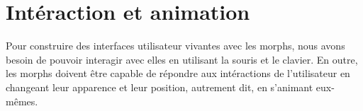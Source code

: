 \documentclass[a4paper,10pt,twoside]{book}
\begin{document}






\section{Int\'eraction et animation}

Pour construire des interfaces utilisateur vivantes avec les morphs,
nous avons besoin de pouvoir interagir avec elles en utilisant la
souris et le clavier.
En outre, les morphs doivent \^etre capable de r\'epondre aux
int\'eractions de l'utilisateur en changeant leur apparence et leur
position, autrement dit, en s'animant eux-m\^emes.
\end{document}
